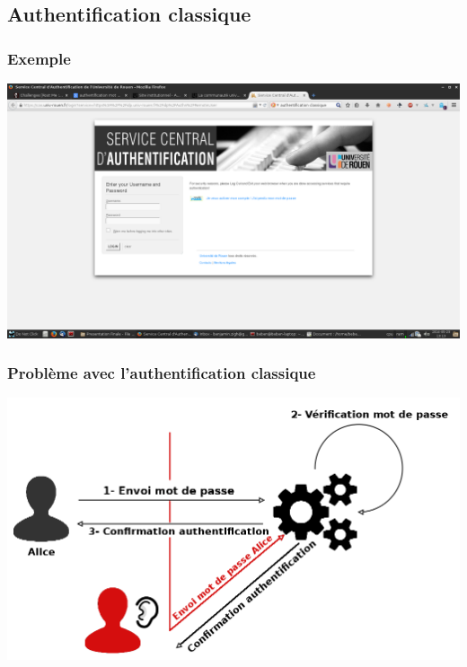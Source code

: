 \documentclass[xcolor=table]{beamer}
\begin{document}
\subsection{Authentification classique}
\begin{frame}
\frametitle{Exemple}
\includegraphics[scale=0.21]{../graphics/auth-mdp.png}
\end{frame}

\begin{frame}
\frametitle{Problème avec l'authentification classique}
\includegraphics[scale=0.24]{../graphics/authsimple1.png}
\end{frame}
\end{document}
